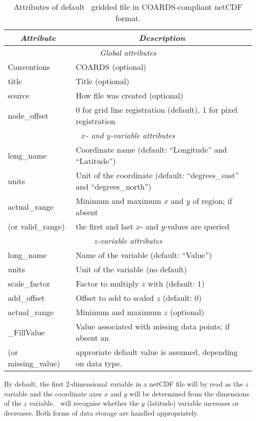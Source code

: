 \begin{table}
\centering
\begin{tabular}{|l|l|} \hline
\multicolumn{1}{|c}{\emph{Attribute}}   &       \multicolumn{1}{|c|}{\emph{Description}}        \\ \hline
\multicolumn{2}{|c|}{\emph{Global attributes}} \\ \hline
Conventions			& COARDS (optional) \\ \hline
title				& Title (optional) \\ \hline
source				& How file was created (optional) \\ \hline
node\_offset			& 0 for grid line registration (default), 1 for pixel registration \\ \hline
\multicolumn{2}{|c|}{\emph{$x$- and $y$-variable attributes}} \\ \hline
long\_name			& Coordinate name (default: ``Longitude'' and ``Latitude'') \\ \hline
units				& Unit of the coordinate (default: ``degrees_east'' and ``degrees_north'') \\ \hline
actual\_range			& Minimum and maximum $x$ and $y$ of region; if absent \\
(or valid\_range)		& the first and last $x$- and $y$-values are queried \\ \hline
\multicolumn{2}{|c|}{\emph{$z$-variable attributes}} \\ \hline
long\_name			& Name of the variable (default: ``Value'') \\ \hline
units				& Unit of the variable (no default) \\ \hline
scale\_factor			& Factor to multiply $z$ with (default: 1) \\ \hline
add\_offset			& Offset to add to scaled $z$ (default: 0) \\ \hline
actual\_range			& Minimum and maximum $z$ (optional) \\ \hline
\_FillValue			& Value associated with missing data points; if absent an\\
(or missing\_value)		& approriate default value is assumed, depending on data type. \\ \hline
\end{tabular} 
\caption{Attributes of default \gmt\ gridded file in COARDS-compliant netCDF format.}
\label{tbl:netcdf-format}
\end{table}

By default, the first 2-dimensional variable in a netCDF file will by read as the $z$ variable
and the coordinate axes $x$ and $y$ will be determined from the dimensions of the $z$ variable.
\GMT\ will recognise whether the $y$ (latitude) variable increases or decreases. Both forms of
data storage are handled appropriately.

